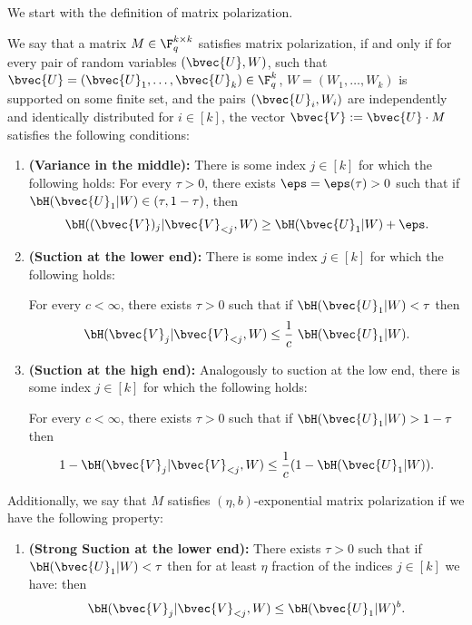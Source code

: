 \documentclass[11pt]{article}
\begin{document}
We start with the definition of matrix polarization.


\begin{definition}
	\label{def:matrix-polarization}
	We say that a matrix $M \in \F_q^{k\times k}$ satisfies matrix polarization, if and only if for every pair of random variables $(\bvec{U}, W)$, such that  $\bvec{U} = (\bvec{U}_1,\dots,\bvec{U}_k) \in \F_q^k$, $W = (W_1,\ldots,W_k)$ is supported on some finite set, and the pairs  $(\bvec{U}_i,W_i)$ are independently and identically distributed for $i \in [k]$, the vector $\bvec{V} := \bvec{U} \cdot M$ satisfies the following conditions:
	\begin{enumerate}
		\item
		{\bf (Variance in the middle):}
		There is some index $j \in [k]$
		for which the following holds:
		For every $\tau > 0$, there exists $\eps=\eps(\tau) > 0$ such that
		if $\bH(\bvec{U}_1 | W) \in (\tau, 1-\tau)$,
		then
		$$\bH((\bvec{V})_j | \bvec{V}_{< j}, W)  \geq \bH(\bvec{U}_1 | W) + \eps.$$
		
		\item
		{\bf (Suction at the lower end):}
		There is some index $j \in [k]$
		for which the following holds:
		
		For every $c < \infty$, there  exists $\tau > 0$ such that
		if
		$\bH(\bvec{U}_1 | W) < \tau$
		then
		$$\bH(\bvec{V}_j | \bvec{V}_{< j}, W)  \leq \frac{1}{c}~\bH(\bvec{U}_1 | W).$$
		
		
		\item
		{\bf (Suction at the high end):}
		Analogously to suction at the low end, there is some index $j \in [k]$
		for which the following holds:
		
		For every $c < \infty$, there  exists $\tau > 0$ such that
		if
		$\bH(\bvec{U}_1 | W) > 1-\tau$
		then
		$$1 - \bH(\bvec{V}_j | \bvec{V}_{< j}, W)
		\leq \frac{1}{c}(1-\bH(\bvec{U}_1 | W)).$$
	\end{enumerate}
	Additionally, we say that $M$ satisfies $(\eta,b)$-exponential matrix polarization if we have the following property:
	\begin{enumerate}
		\item[2'.] {\bf (Strong Suction at the lower end):}
		There  exists $\tau > 0$ such that
		if
		$\bH(\bvec{U}_1 | W) < \tau$ then for at least $\eta$ fraction of the indices $j \in [k]$ we have: 
		then
		$$\bH(\bvec{V}_j | \bvec{V}_{< j}, W)  \leq \bH(\bvec{U}_1 | W)^b .$$
	\end{enumerate}
\end{definition}
\end{document}
